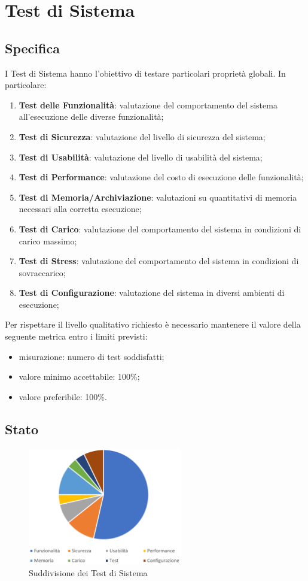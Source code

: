 \section{Test di Sistema}

	\subsection{Specifica}
		I Test di Sistema hanno l'obiettivo di testare particolari proprietà globali. In particolare:
		\begin{enumerate}
			\item{\textbf{Test delle Funzionalità}: valutazione del comportamento del sistema all'esecuzione delle diverse funzionalità;}
			\item{\textbf{Test di Sicurezza}: valutazione del livello di sicurezza del sistema;}
			\item{\textbf{Test di Usabilità}: valutazione del livello di usabilità del sistema;}
			\item{\textbf{Test di Performance}: valutazione del costo di esecuzione delle funzionalità;}
			\item{\textbf{Test di Memoria/Archiviazione}: valutazioni su quantitativi di memoria necessari alla corretta esecuzione;}
			\item{\textbf{Test di Carico}: valutazione del comportamento del sistema in condizioni di carico massimo;}
			\item{\textbf{Test di Stress}: valutazione del comportamento del sistema in condizioni di sovraccarico;}
			\item{\textbf{Test di Configurazione}: valutazione del sistema in diversi ambienti di esecuzione;}
		\end{enumerate}
		Per rispettare il livello qualitativo richiesto è necessario mantenere il valore della seguente metrica entro i limiti previsti:
		\begin{itemize}
			\item{misurazione: numero di test soddisfatti;}
			\item{valore minimo accettabile: 100\%;}
			\item{valore preferibile: 100\%.}
		\end{itemize}
	
	
	\subsection{Stato}
		
		\begin{figure}[H]
			\centering
			\includegraphics[width=0.6\textwidth]{./res/sections/test/sistema/graph.png}
			\caption{Suddivisione dei Test di Sistema}
		\end{figure}
	
		